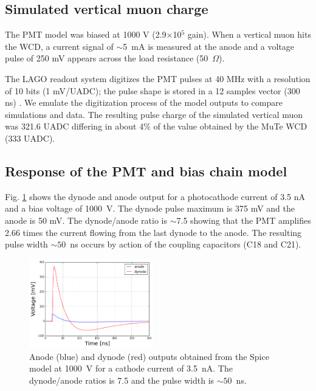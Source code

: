 \documentclass[letterpaper, 10 pt, conference]{ieeeconf}  %
\begin{document}
\subsection{Simulated vertical muon charge}

The PMT model was biased at 1000 V (2.9$\times$10$^5$ gain). When a vertical muon hits the WCD, a current signal of $\sim$5~mA is measured at the anode and a voltage pulse of 250 mV appears across the load resistance (50~$\Omega$). 

The LAGO readout system digitizes the PMT pulses at 40 MHz with a resolution of 10 bits (1 mV/UADC); the pulse shape is stored in a 12 samples vector (300 ns) \cite{SofoHaro2016}. We emulate the digitization process of the model outputs to compare simulations and data. The resulting pulse charge of the simulated vertical muon was 321.6 UADC differing in about 4$\%$ of the value obtained by the MuTe WCD (333 UADC).



\subsection{Response of the PMT and bias chain model}

Fig. \ref{Pulse} shows the dynode and anode output for a photocathode current of 3.5 nA and a bias voltage of 1000~V. The dynode pulse maximum is 375 mV and the anode is 50 mV. The dynode/anode ratio  is $\sim$7.5 showing that the PMT amplifies 2.66 times the current flowing from the last dynode to the anode. The resulting pulse width $\sim50$~ns occurs by action of the coupling capacitors (C18 and C21).

\begin{figure}[h!]
\begin{center}
\includegraphics[width=0.48\textwidth]{Figures/spice_pulse.png}
\caption{Anode (blue) and dynode (red) outputs obtained from the Spice model at 1000~V for a cathode current of 3.5~nA. The dynode/anode ratios is 7.5 and the pulse width is $\sim50$~ns.}
\label{Pulse}
\end{center}
\end{figure}
\end{document}
